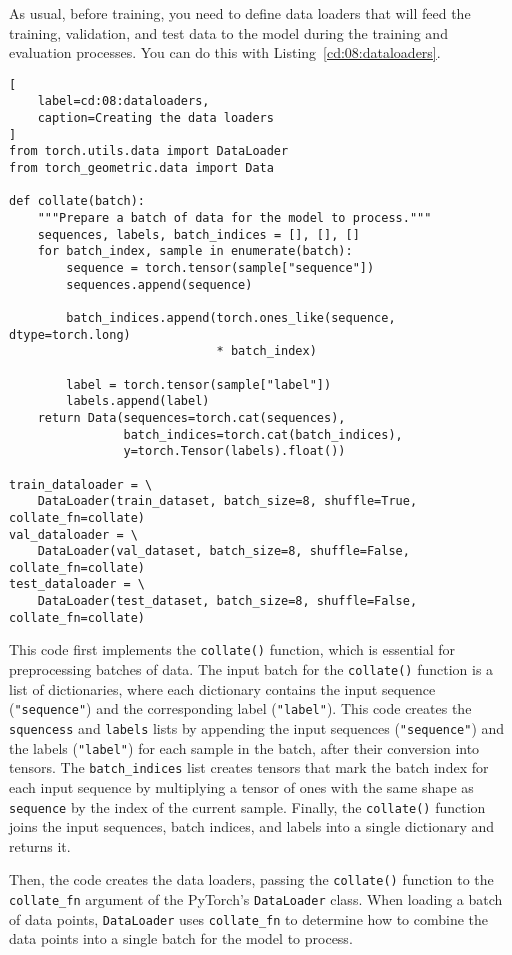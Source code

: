 As usual, before training, you need to define data loaders that will feed the training, validation, and test data to the model during the training and evaluation processes.
You can do this with Listing~\ref{cd:08:dataloaders}.
\begin{lstlisting}[
    label=cd:08:dataloaders,
    caption=Creating the data loaders
]
from torch.utils.data import DataLoader
from torch_geometric.data import Data

def collate(batch):
    """Prepare a batch of data for the model to process."""
    sequences, labels, batch_indices = [], [], []
    for batch_index, sample in enumerate(batch):
        sequence = torch.tensor(sample["sequence"])
        sequences.append(sequence)

        batch_indices.append(torch.ones_like(sequence, dtype=torch.long) 
                             * batch_index)
        
        label = torch.tensor(sample["label"])
        labels.append(label)
    return Data(sequences=torch.cat(sequences), 
                batch_indices=torch.cat(batch_indices),
                y=torch.Tensor(labels).float())

train_dataloader = \
    DataLoader(train_dataset, batch_size=8, shuffle=True, collate_fn=collate)
val_dataloader = \
    DataLoader(val_dataset, batch_size=8, shuffle=False, collate_fn=collate)
test_dataloader = \
    DataLoader(test_dataset, batch_size=8, shuffle=False, collate_fn=collate)
\end{lstlisting}
This code first implements the \lstinline{collate()} function, which is essential for preprocessing batches of data.
The input batch for the \lstinline{collate()} function is a list of dictionaries, where each dictionary contains the input sequence (\lstinline{"sequence"}) and the corresponding label (\lstinline{"label"}). 
This code creates the \lstinline{squencess} and \lstinline{labels} lists by appending the input sequences (\lstinline{"sequence"}) and the labels (\lstinline{"label"}) for each sample in the batch, after their conversion into tensors. 
The \lstinline{batch_indices} list creates tensors that mark the batch index for each input sequence by multiplying a tensor of ones with the same shape as \lstinline{sequence} by the index of the current sample. 
Finally, the \lstinline{collate()} function joins the input sequences, batch indices, and labels into a single dictionary and returns it.

Then, the code creates the data loaders, passing the \lstinline{collate()} function to the \lstinline{collate_fn} argument of the PyTorch's \lstinline{DataLoader} class.
When loading a batch of data points, \lstinline{DataLoader} uses \lstinline{collate_fn} to determine how to combine the data points into a single batch for the model to process. 

